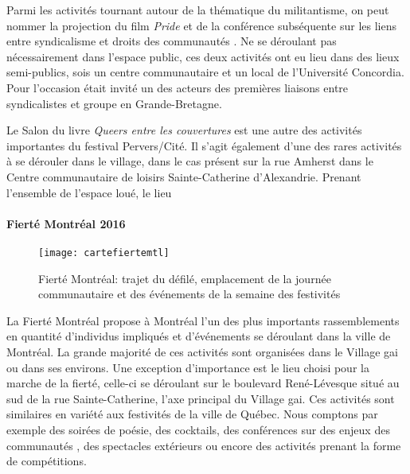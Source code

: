 Parmi les activités tournant autour de la thématique du militantisme, on peut nommer la projection du film \emph{Pride} et de la conférence subséquente sur les liens entre syndicalisme et droits des communautés \lgbt{}.
Ne se déroulant pas nécessairement dans l'espace public, ces deux activités ont eu lieu dans des lieux semi-publics, sois un centre communautaire et un local de l'Université Concordia.
Pour l'occasion était invité un des acteurs  des premières liaisons entre syndicalistes et groupe \lgbt{} en Grande-Bretagne.

Le Salon du livre \emph{Queers entre les couvertures} est une autre des activités importantes du festival Pervers/Cité.
Il s'agit également d'une des rares activités à se dérouler dans le village, dans le cas présent sur la rue Amherst dans le Centre communautaire de loisirs Sainte-Catherine d'Alexandrie.
Prenant l'ensemble de l'espace loué, le lieu

\paragraph{Fierté Montréal 2016}
\label{subsec:fiertemontreal2016}

\begin{figure}[h]
  \centering
  \texttt{[image: cartefiertemtl]}
  \caption[Fierté Montréal: trajet du défilé]{Fierté Montréal: trajet du défilé, emplacement de la journée communautaire et des événements de la semaine des festivités}
  \label{fig:cartefiertemtl}
\end{figure}

La Fierté Montréal propose à Montréal l'un des plus importants rassemblements \lgbt en quantité d'individus impliqués et d'événements se déroulant dans la ville de Montréal.
La grande majorité de ces activités sont organisées dans le Village gai ou dans ses environs.
Une exception d'importance est le lieu choisi pour la marche de la fierté, celle-ci se déroulant sur le boulevard René-Lévesque situé au sud de la rue Sainte-Catherine, l'axe principal du Village gai.
Ces activités sont similaires en variété aux festivités de la ville de Québec.
Nous comptons par exemple des soirées de poésie, des cocktails, des conférences sur des enjeux des communautés \lgbt, des spectacles extérieurs ou encore des activités prenant la forme de compétitions.


